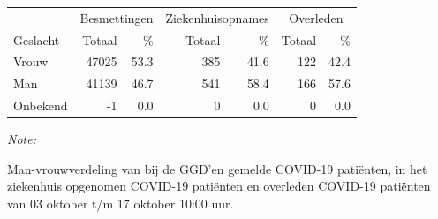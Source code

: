 \documentclass[
  english,
  man,floatsintext]{apa6}
\begin{document}
\begin{table}[H]
\centering\begingroup\fontsize{11}{13}\selectfont

\begin{threeparttable}
\begin{tabular}{lrrrrrr}
\toprule
\multicolumn{1}{c}{ } & \multicolumn{2}{c}{Besmettingen} & \multicolumn{2}{c}{Ziekenhuisopnames} & \multicolumn{2}{c}{Overleden} \\
\cmidrule(l{3pt}r{3pt}){2-3} \cmidrule(l{3pt}r{3pt}){4-5} \cmidrule(l{3pt}r{3pt}){6-7}
Geslacht & Totaal & \% & Totaal & \% & Totaal & \%\\
\midrule
Vrouw & 47025 & 53.3 & 385 & 41.6 & 122 & 42.4\\
Man & 41139 & 46.7 & 541 & 58.4 & 166 & 57.6\\
Onbekend & -1 & 0.0 & 0 & 0.0 & 0 & 0.0\\
\bottomrule
\end{tabular}
\begin{tablenotes}
\item \textit{Note: } 
\item Man-vrouwverdeling van bij de GGD’en gemelde COVID-19 patiënten, in het ziekenhuis opgenomen COVID-19 patiënten en overleden COVID-19 patiënten van 03 oktober t/m 17 oktober 10:00 uur.
\end{tablenotes}
\end{threeparttable}
\endgroup{}
\end{table}
\newpage
\end{document}
